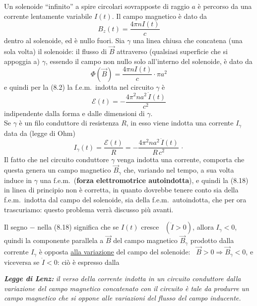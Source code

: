 Un solenoide ``infinito'' a spire circolari sovrapposte di raggio $a$ \`e
percorso da una corrente lentamente variabile $I(t)$. Il campo magnetico \`e
dato da
\begin{equation}
  B_z(t)=\frac{4\pi nI(t)}{c}
  \tag{8.15}
\end{equation}
dentro al solenoide, ed \`e nullo fuori. Sia $\gamma$ una linea chiusa che
concatena (una sola volta) il solenoide: il flusso di $\vec B$ attraverso
(qualsiasi superficie che si appoggia a) $\gamma$,
essendo il campo non nullo solo all'interno del solenoide, \`e dato da
\begin{equation}
  \Phi(\vec B)=\frac{4\pi nI(t)}{c}\cdot\pi a^2
  \tag{8.16}
\end{equation}
e quindi per la (8.2) la f.e.m.\ indotta nel circuito $\gamma$ \`e
\begin{equation}
  \mathcal E(t)=-\frac{4\pi^2na^2\,\dot I(t)}{c^2}
  \tag{8.17}
\end{equation}
indipendente dalla forma e dalle dimensioni di $\gamma$.\\
Se $\gamma$ \`e un filo conduttore di resistenza $R$, in esso viene indotta una
corrente $I_\gamma$ data da (legge di Ohm)
\begin{equation}
  I_\gamma(t)=\frac{\mathcal E(t)}{R}
  =-\frac{4\pi^2na^2\,\dot I(t)}{R\,c^2}\,\cdot
  \tag{8.18}
\end{equation}
Il fatto che nel circuito conduttore $\gamma$ venga indotta una corrente,
comporta che questa genera un campo magnetico $\vec B_\gamma$ che, variando nel
tempo, a sua volta induce in $\gamma$ una f.e.m.\ (\textbf{forza elettromotrice
autoindotta}), e quindi la (8.18) in linea di principio non \`e corretta, in
quanto dovrebbe tenere conto sia della f.e.m.\ indotta dal campo del solenoide,
sia della f.e.m.\ autoindotta, che per ora trascuriamo: questo problema verr\`a
discusso pi\`u avanti.

Il segno $-$ nella (8.18) significa che se $I(t)$ cresce \ $(\dot I>0)$, allora
$I_\gamma<0$, quindi la componente parallela a $\vec B$ del campo magnetico
$\vec B_\gamma$ prodotto dalla corrente $I_\gamma$ \`e opposta \underline{alla
variazione} del campo del solenoide: \ $\vec B>0\Rightarrow\vec B_\gamma<0$, e
viceversa se $\dot I<0$: ci\`o \`e espresso dalla

\textbf{\textit{Legge di Lenz:}} \textit{il verso della corrente indotta in un
circuito conduttore dalla variazione del campo magnetico concatenato con il
circuito \`e tale da produrre un campo magnetico che si oppone alle variazioni
del flusso del campo inducente.}

